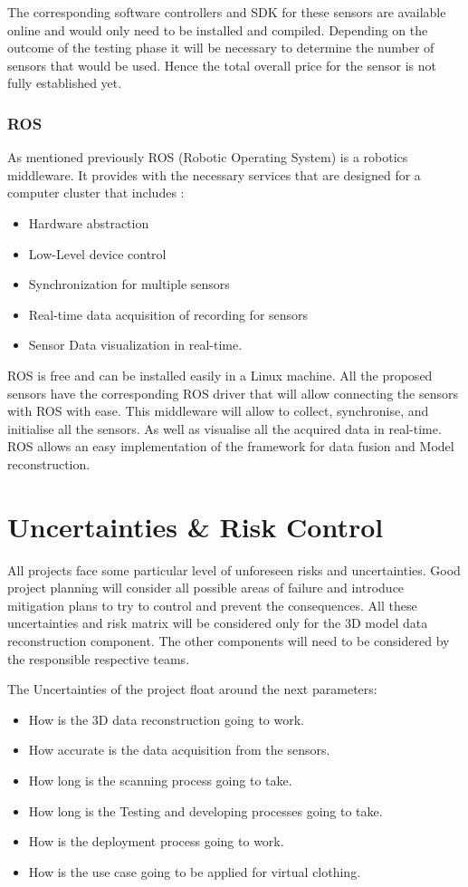 \documentclass[12pt]{report}
\begin{document}
The corresponding software controllers and SDK for these sensors are available online and would only need to be installed and compiled. 
Depending on the outcome of the testing phase it will be necessary to determine the number of sensors that would be used. Hence the total overall price for the sensor is not fully established yet. 

\subsubsection{ROS}
As mentioned previously ROS (Robotic Operating System) is a robotics middleware. It provides with the necessary services that are designed for a computer cluster that includes : 
\begin{itemize}
  \item Hardware abstraction
  \item Low-Level device control
  \item Synchronization for multiple sensors
  \item Real-time data acquisition of recording for sensors
  \item Sensor Data visualization in real-time.
\end{itemize}

ROS is free and can be installed easily in a Linux machine. All the proposed sensors have the corresponding ROS driver that will allow connecting the sensors with ROS with ease. 
This middleware will allow to collect, synchronise, and initialise all the sensors. As well as visualise all the acquired data in real-time. ROS allows an easy implementation of the framework for data fusion and Model reconstruction. 

\section{Uncertainties \& Risk Control}
All projects face some particular level of unforeseen risks and uncertainties. Good project planning will consider all possible areas of failure and introduce mitigation plans to try to control and prevent the consequences.  
All these uncertainties and risk matrix will be considered only for the 3D model data reconstruction component. The other components will need to be considered by the responsible respective teams. 

The Uncertainties of the project float around the next parameters:
\begin{itemize}
  \item How is the 3D data reconstruction going to work.
  \item How accurate is the data acquisition from the sensors.
  \item How long is the scanning process going to take. 
  \item How long is the Testing and developing processes going to take. 
  \item How is the deployment process going to work.
  \item How is the use case going to be applied for virtual clothing.
\end{itemize}
\end{document}
